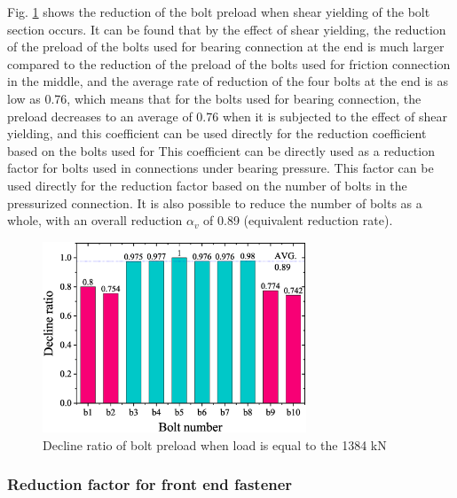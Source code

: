 Fig. \ref{fig-b4ls} shows the reduction of the bolt preload when shear yielding of the bolt section occurs. It can be found that by the effect of shear yielding, the reduction of the preload of the bolts used for bearing connection at the end is much larger compared to the reduction of the preload of the bolts used for friction connection in the middle, and the average rate of reduction of the four bolts at the end is as low as 0.76, which means that for the bolts used for bearing connection, the preload decreases to an average of 0.76 when it is subjected to the effect of shear yielding, and this coefficient can be used directly for the reduction coefficient based on the bolts used for This coefficient can be directly used as a reduction factor for bolts used in connections under bearing pressure. This factor can be used directly for the reduction factor based on the number of bolts in the pressurized connection. It is also possible to reduce the number of bolts as a whole, with an overall reduction $\alpha_v$ of 0.89 (equivalent reduction rate).

\begin{figure}[htbp]
    \centering
    \includegraphics[width=0.7\textwidth]{imgs/ch7/b4-ls.eps}
    \caption{Decline ratio of bolt preload when load is equal to the 1384 kN}
    \label{fig-b4ls}
\end{figure}

\subsubsection{Reduction factor for front end fastener}

